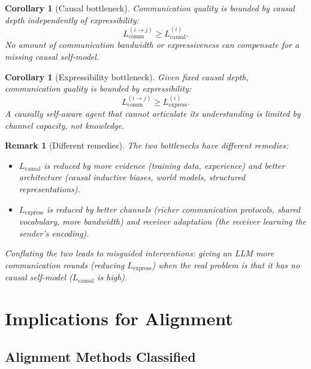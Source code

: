 \documentclass[11pt,a4paper]{article}
\newtheorem{corollary}[theorem]{Corollary}
\newtheorem{remark}[theorem]{Remark}
\begin{document}
\begin{corollary}[Causal bottleneck]\label{cor:causal-bottleneck}
Communication quality is bounded by causal depth independently of
expressibility:
\begin{equation}
    L_{\text{comm}}^{(i \to j)} \geq L_{\text{causal}}^{(i)}.
\end{equation}
No amount of communication bandwidth or expressiveness can compensate
for a missing causal self-model.
\end{corollary}

\begin{corollary}[Expressibility bottleneck]\label{cor:express-bottleneck}
Given fixed causal depth, communication quality is bounded by
expressibility:
\begin{equation}
    L_{\text{comm}}^{(i \to j)} \geq L_{\text{express}}^{(i)}.
\end{equation}
A causally self-aware agent that cannot articulate its understanding
is limited by channel capacity, not knowledge.
\end{corollary}

\begin{remark}[Different remedies]
The two bottlenecks have different remedies:
\begin{itemize}
    \item $L_{\text{causal}}$ is reduced by \emph{more evidence}
    (training data, experience) and \emph{better architecture}
    (causal inductive biases, world models, structured representations).
    \item $L_{\text{express}}$ is reduced by \emph{better channels}
    (richer communication protocols, shared vocabulary, more bandwidth)
    and \emph{receiver adaptation} (the receiver learning the sender's
    encoding).
\end{itemize}
Conflating the two leads to misguided interventions: giving an LLM
more communication rounds (reducing $L_{\text{express}}$) when the
real problem is that it has no causal self-model ($L_{\text{causal}}$
is high).
\end{remark}


\section{Implications for Alignment}

\subsection{Alignment Methods Classified}
\end{document}
